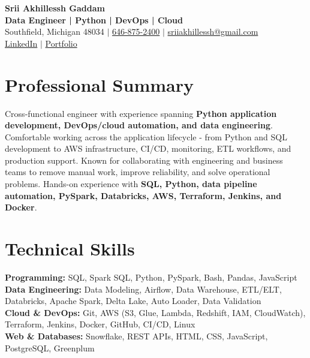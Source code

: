 \documentclass[letterpaper,10pt]{article}
\begin{document}
\fontsize{9.35pt}{10.45pt}\selectfont

\begin{center}
    {\LARGE \textbf{Srii Akhillessh Gaddam}} \\[-1pt]
    \textbf{Data Engineer | Python | DevOps | Cloud} \\[2pt]
    Southfield, Michigan 48034 $|$
    \href{tel:6468752400}{646-875-2400} $|$
    \href{mailto:sriiakhillessh@gmail.com}{sriiakhillessh@gmail.com} \\[1pt]
    \href{https://www.linkedin.com/in/srii-akhiilessh-gaddam-b48668191/}{LinkedIn} $|$
    \href{https://sriiakhillesshg.github.io/portfolio/}{Portfolio}
\end{center}
\vspace{-8pt}

\section{Professional Summary}
\small{Cross-functional engineer with experience spanning \textbf{Python application development, DevOps/cloud automation, and data engineering}. Comfortable working across the application lifecycle - from Python and SQL development to AWS infrastructure, CI/CD, monitoring, ETL workflows, and production support. Known for collaborating with engineering and business teams to remove manual work, improve reliability, and solve operational problems. Hands-on experience with \textbf{SQL, Python, data pipeline automation, PySpark, Databricks, AWS, Terraform, Jenkins, and Docker}.}

\section{Technical Skills}
\small{
\textbf{Programming:} SQL, Spark SQL, Python, PySpark, Bash, Pandas, JavaScript \\
\textbf{Data Engineering:} Data Modeling, Airflow, Data Warehouse, ETL/ELT, Databricks, Apache Spark, Delta Lake, Auto Loader, Data Validation \\
\textbf{Cloud \& DevOps:} Git, AWS (S3, Glue, Lambda, Redshift, IAM, CloudWatch), Terraform, Jenkins, Docker, GitHub, CI/CD, Linux \\
\textbf{Web \& Databases:} Snowflake, REST APIs, HTML, CSS, JavaScript, PostgreSQL, Greenplum
}
\end{document}
